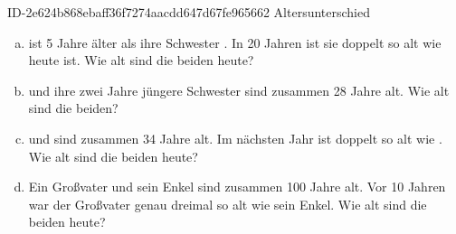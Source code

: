 \begin{exercise}
      {ID-2e624b868ebaff36f7274aacdd647d67fe965662}
      {Altersunterschied}
  \ifproblem\problem\par
    \begin{enumerate}[a)]
      \item \xxa{} ist 5 Jahre älter als ihre Schwester \xxb{}. In 20 Jahren ist sie
            doppelt so alt wie \xxb{} heute ist. Wie alt sind die beiden heute?
      \item \xxc{} und ihre zwei Jahre jüngere Schwester \xxd{} sind zusammen 28 Jahre alt.
            Wie alt sind die beiden?
      \item \xya{} und \xyb{} sind zusammen 34 Jahre alt. Im nächsten Jahr ist \xya{}
            doppelt so alt wie \xyb{}. Wie alt sind die beiden heute?
      \item Ein Großvater und sein Enkel sind zusammen 100 Jahre alt. Vor 10 Jahren
            war der Großvater genau dreimal so alt wie sein Enkel. Wie alt sind die
            beiden heute?
    \end{enumerate}
  \fi
\end{exercise}
